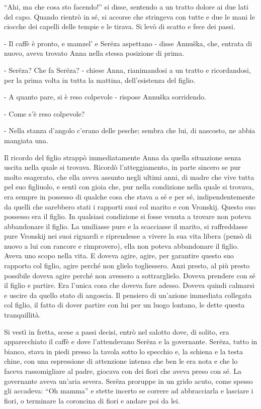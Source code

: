 ``Ahi, ma che cosa sto facendo!'' si disse, sentendo a un tratto dolore ai due lati del capo. Quando rientrò in sé, si accorse che stringeva con tutte e due le mani le ciocche dei capelli delle tempie e le tirava. Si levò di scatto e fece dei passi. 

- Il caffè è pronto, e mamzel' e Serëza aspettano - disse Annuška, che, entrata di nuovo, aveva trovato Anna nella stessa posizione di prima. 

- Serëza? Che fa Serëza? - chiese Anna, rianimandosi a un tratto e ricordandosi, per la prima volta in tutta la mattina, dell'esistenza del figlio. 

- A quanto pare, si è reso colpevole - rispose Annuška sorridendo. 

- Come s'è reso colpevole? 

- Nella stanza d'angolo c'erano delle pesche; sembra che lui, di nascosto, ne abbia mangiata una. 

Il ricordo del figlio strappò immediatamente Anna da quella situazione senza uscita nella quale si trovava. Ricordò l'atteggiamento, in parte sincero se pur molto esagerato, che ella aveva assunto negli ultimi anni, di madre che vive tutta pel suo figliuolo, e sentì con gioia che, pur nella condizione nella quale si trovava, era sempre in possesso di qualche cosa che stava a sé e per sé, indipendentemente da quelli che sarebbero stati i rapporti suoi col marito e con Vronskij. Questo suo possesso era il figlio. In qualsiasi condizione si fosse venuta a trovare non poteva abbandonare il figlio. La umiliasse pure e la scacciasse il marito, si raffreddasse pure Vronskij nei suoi riguardi e riprendesse a vivere la sua vita libera (pensò di nuovo a lui con rancore e rimprovero), ella non poteva abbandonare il figlio. Aveva uno scopo nella vita. E doveva agire, agire, per garantire questo suo rapporto col figlio, agire perché non glielo togliessero. Anzi presto, al più presto possibile doveva agire perché non avessero a sottrarglielo. Doveva prendere con sé il figlio e partire. Era l'unica cosa che doveva fare adesso. Doveva quindi calmarsi e uscire da quello stato di angoscia. Il pensiero di un'azione immediata collegata col figlio, il fatto di dover partire con lui per un luogo lontano, le dette questa tranquillità. 

Si vestì in fretta, scese a passi decisi, entrò nel salotto dove, di solito, era apparecchiato il caffè e dove l'attendevano Serëza e la governante. Serëza, tutto in bianco, stava in piedi presso la tavola sotto lo specchio e, la schiena e la testa chine, con una espressione di attenzione intensa che ben le era nota e che lo faceva rassomigliare al padre, giocava con dei fiori che aveva preso con sé. La governante aveva un'aria severa. Serëza proruppe in un grido acuto, come spesso gli accadeva: ``Oh mamma'' e stette incerto se correre ad abbracciarla e lasciare i fiori, o terminare la coroncina di fiori e andare poi da lei. 

